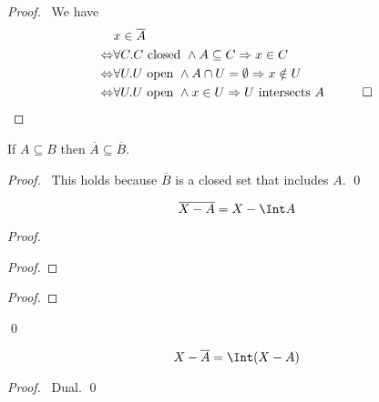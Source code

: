 \begin{proof}
    \pf\ We have
    \begin{align*}
        & x \in \overline{A} \\
        \Leftrightarrow & \forall C. C \text{ closed } \wedge A \subseteq C \Rightarrow x \in C \\
        \Leftrightarrow & \forall U. U \text{ open } \wedge A \cap U = \emptyset \Rightarrow x \notin U \\
        \Leftrightarrow & \forall U. U \text{ open } \wedge x \in U \Rightarrow U \text{ intersects } A & \qed
    \end{align*}
\end{proof}

\begin{proposition}
    \label{proposition:closure_monotone}
    If $A \subseteq B$ then $\overline{A} \subseteq \overline{B}$.
\end{proposition}

\begin{proof}
    \pf\ This holds because $\overline{B}$ is a closed set that includes $A$. \qed
\end{proof}

\begin{proposition}
    \label{proposition:closure_int_complement}
    \[ \overline{X - A} = X - \Int A \]
\end{proposition}

\begin{proof}
    \pf
    \begin{proof}
    \end{proof}
    \begin{proof}
    \end{proof}
    \qed
\end{proof}

\begin{proposition}
    \[ X - \overline{A} = \Int (X - A) \]
\end{proposition}

\begin{proof}
    \pf\ Dual. \qed
\end{proof}

